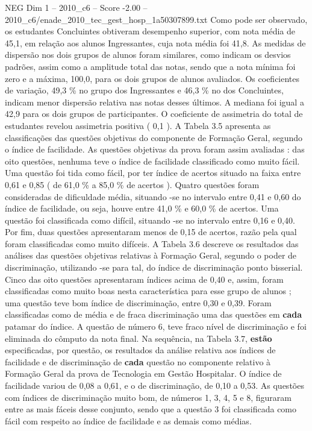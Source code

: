 \begin{textsample}{NEG Dim 1 – 2010\_c6 – Score -2.00 – 2010\_c6/enade\_2010\_tec\_gest\_hosp\_1a50307899.txt}
Como pode ser observado, os estudantes Concluintes obtiveram desempenho superior, com nota média de 45,1, em relação aos alunos Ingressantes, cuja nota média foi 41,8.
As medidas de dispersão nos dois grupos de alunos foram similares, como indicam os desvios padrões, assim como a amplitude total das notas, sendo que a nota mínima foi zero e a máxima, 100,0, para os dois grupos de alunos avaliados.
Os coeficientes de variação, 49,3 \% no grupo dos Ingressantes e 46,3 \% no dos Concluintes, indicam menor dispersão relativa nas notas desses últimos.
A mediana foi igual a 42,9 para os dois grupos de participantes.
O coeficiente de assimetria do total de estudantes revelou assimetria positiva ( 0,1 ).
A Tabela 3.5 apresenta as classificações das questões objetivas do componente de Formação Geral, segundo o índice de facilidade.
As questões objetivas da prova foram assim avaliadas : das oito questões, nenhuma teve o índice de facilidade classificado como muito fácil.
Uma questão foi tida como fácil, por ter índice de acertos situado na faixa entre 0,61 e 0,85 ( de 61,0 \% a 85,0 \% de acertos ).
Quatro questões foram consideradas de dificuldade média, situando -se no intervalo entre 0,41 e 0,60 do índice de facilidade, ou seja, houve entre 41,0 \% e 60,0 \% de acertos.
Uma questão foi classificada como difícil, situando -se no intervalo entre 0,16 e 0,40.
Por fim, duas questões apresentaram menos de 0,15 de acertos, razão pela qual foram classificadas como muito difíceis.
A Tabela 3.6 descreve os resultados das análises das questões objetivas relativas à Formação Geral, segundo o poder de discriminação, utilizando -se para tal, do índice de discriminação ponto bisserial.
Cinco das oito questões apresentaram índices acima de 0,40 e, assim, foram classificadas como muito boas nesta característica para esse grupo de alunos ; uma questão teve bom índice de discriminação, entre 0,30 e 0,39.
Foram classificadas como de média e de fraca discriminação uma das questões em \textbf{cada} patamar do índice.
A questão de número 6, teve fraco nível de discriminação e foi eliminada do cômputo da nota final.
Na sequência, na Tabela 3.7, \textbf{estão} especificadas, por questão, os resultados da análise relativa aos índices de facilidade e de discriminação de \textbf{cada} questão no componente relativo à Formação Geral da prova de Tecnologia em Gestão Hospitalar.
O índice de facilidade variou de 0,08 a 0,61, e o de discriminação, de 0,10 a 0,53.
As questões com índices de discriminação muito bom, de números 1, 3, 4, 5 e 8, figuraram entre as mais fáceis desse conjunto, sendo que a questão 3 foi classificada como fácil com respeito ao índice de facilidade e as demais como médias.

\end{textsample}
